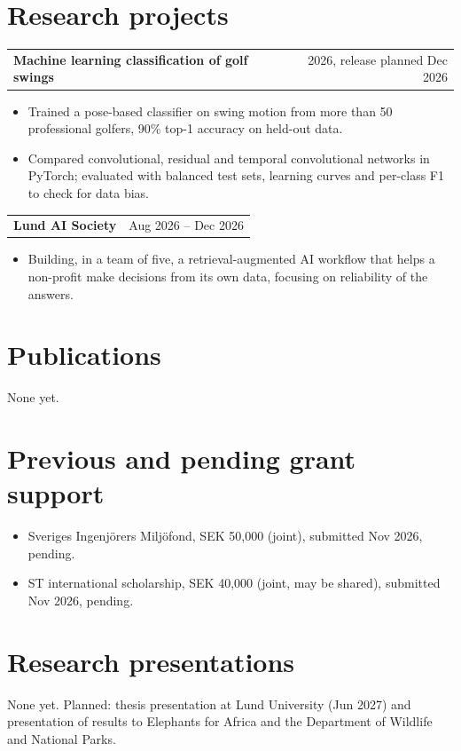 \documentclass[11pt,a4paper]{article}
\makeatletter
\newcommand{\cvitem}[2]{\par\needspace{3\baselineskip}\noindent
  \begin{tabularx}{\textwidth}{@{}>{\raggedright\arraybackslash}X@{\hspace{1em}}r@{}}\textbf{#1} & #2\end{tabularx}\par\nopagebreak}
\makeatother
\begin{document}
\section{Research projects}
\cvitem{Machine learning classification of golf swings}{2026, release planned Dec 2026}
\begin{itemize}
  \item Trained a pose-based classifier on swing motion from more than 50 professional golfers, 90\% top-1 accuracy on held-out data.
  \item Compared convolutional, residual and temporal convolutional networks in PyTorch; evaluated with balanced test sets, learning curves and per-class F1 to check for data bias.
\end{itemize}
\cvitem{Lund AI Society}{Aug 2026 -- Dec 2026}
\begin{itemize}
  \item Building, in a team of five, a retrieval-augmented AI workflow that helps a non-profit make decisions from its own data, focusing on reliability of the answers.
\end{itemize}

\section{Publications}
None yet.

\section{Previous and pending grant support}
\begin{itemize}
  \item Sveriges Ingenjörers Miljöfond, SEK 50,000 (joint), submitted Nov 2026, pending.
  \item ST international scholarship, SEK 40,000 (joint, may be shared), submitted Nov 2026, pending.
\end{itemize}

\section{Research presentations}
None yet. Planned: thesis presentation at Lund University (Jun 2027) and presentation of results to Elephants for Africa and the Department of Wildlife and National Parks.
\end{document}
